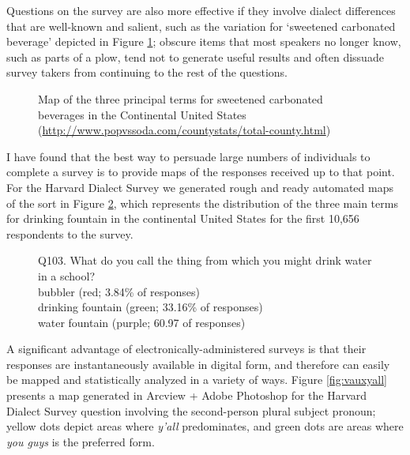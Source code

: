 \documentclass[output=paper]{langscibook}
\begin{document}
Questions on the survey are also more effective if they involve dialect differences that are well-known and salient, such as the variation for `sweetened carbonated beverage' depicted in Figure \ref{fig:sodapop}; obscure items that most speakers no longer know, such as parts of a plow, tend not to generate useful results and often dissuade survey takers from continuing to the rest of the questions.

\begin{figure}
    \centering
    \caption{Map of the three principal terms for sweetened carbonated beverages in the Continental United States (\url{http://www.popvssoda.com/countystats/total-county.html})}
    \label{fig:sodapop}
\end{figure}


I have found that the best way to persuade large numbers of individuals to complete a survey is to provide maps of the responses received up to that point. For the Harvard Dialect Survey we generated rough and ready automated maps of the sort in Figure \ref{fig:vauxwater}, which represents the distribution of the three main terms for drinking fountain in the continental United States for the first 10,656 respondents to the survey.

\begin{figure}
    \centering
    \caption{Q103. What do you call the thing from which you might drink water in a school?\\
	\textbullet  bubbler (red; 3.84\% of responses) \\
	\textbullet drinking fountain (green; 33.16\% of responses) \\
	\textbullet water fountain (purple; 60.97 of responses)}
    \label{fig:vauxwater}
\end{figure}
 
 
A significant advantage of electronically-administered surveys is that their responses are instantaneously available in digital form, and therefore can easily be mapped and statistically analyzed in a variety of ways. Figure \ref{fig:vauxyall} presents a map generated in Arcview + Adobe Photoshop for the Harvard Dialect Survey question involving the second-person plural subject pronoun; yellow dots depict areas where  \textit{y'all}  predominates, and green dots are areas where  \textit{you guys}  is the preferred form.
\end{document}
